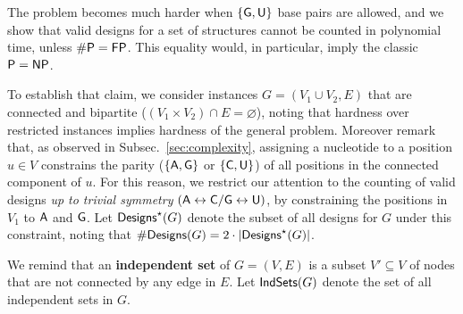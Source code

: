 \documentclass{bioinfo}
\newcommand{\Def}[1]{{\bfseries #1}}
\newcommand{\Design}[1]{{\sf Designs}^{\star}(#1)}
\newcommand{\NumDesign}{\ensuremath{\#}{\sf Designs}\xspace}
\newcommand{\IS}[1]{{\sf IndSets}(#1)}
\newcommand{\Nuc}[1]{{\sf #1}}
\newcommand{\Ab}{\Nuc{A}}
\newcommand{\Cb}{\Nuc{C}}
\newcommand{\Gb}{\Nuc{G}}
\newcommand{\Ub}{\Nuc{U}}
\begin{document}
The problem becomes much harder when $\{\Gb, \Ub\}$ base pairs are allowed, and we show that valid designs for a set of structures cannot be counted in polynomial time, unless ${\sf\# P}={\sf FP}$. This equality would, in particular, imply the classic ${\sf P}={\sf NP}$.

To establish that claim, we consider instances $G=(V_1\cup V_2, E)$ that are connected and bipartite ($(V_1\times V_2) \cap E = \varnothing$), noting that hardness over restricted instances implies hardness of the general problem. Moreover remark that, as observed in Subsec.~\ref{sec:complexity}, assigning a nucleotide to a position $u\in V$ constrains the parity ($\{\Ab,\Gb\}$ or $\{\Cb,\Ub\}$) of all positions in the connected component of $u$. For this reason, we restrict our attention to the counting of valid designs \emph{up to trivial  symmetry} $(\Ab\leftrightarrow \Cb/\Gb\leftrightarrow \Ub)$, by constraining the positions in $V_{1}$ to $\Ab$ and $\Gb$. Let $\Design{G}$ denote the subset of all designs for $G$ under this constraint, noting that $\NumDesign(G) = 2\cdot|\Design{G}|$. 


We remind that an \Def{independent set} of $G=(V,E)$ is a subset $V'\subseteq V$ of nodes that are not connected by any edge in $E$. Let $\IS{G}$ denote the set of all independent sets in $G$.
\end{document}
